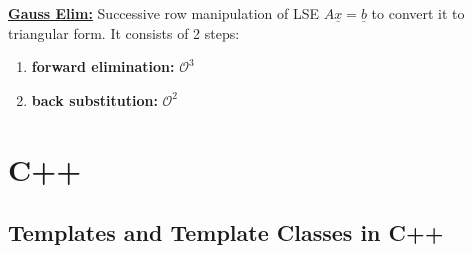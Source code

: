 \documentclass[8pt]{extreport}
\begin{document}
\underline{\textbf{Gauss Elim:}} Successive row manipulation of LSE $A\underline{x} = \underline{b}$ to convert it to triangular form. It consists of 2 steps:
\begin{enumerate}
\item \textbf{forward elimination:} $\mathcal{O}^3$
\item \textbf{back substitution:} $\mathcal{O}^2$
\end{enumerate}  














































































\chapter{C++}

\section{Templates and Template Classes in C++} 
\end{document}
